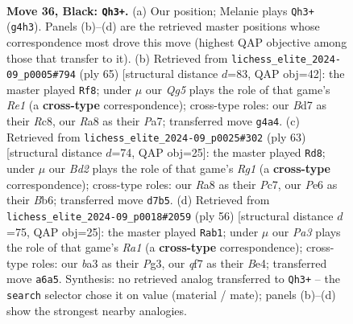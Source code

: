 \documentclass[11pt]{article}
\begin{document}
\clearpage

\begin{figure}[p]\centering
\begin{subfigure}{0.46\textwidth}\centering
\resizebox{\linewidth}{!}{%
\newchessgame
\chessboard[
  setfen={r2r3k/bp1b1Q2/p3p2p/8/6q1/BP1p4/PR3P1P/4RK2 b - - 1 36},
  showmover=false,
  pgfstyle=straightmove, color=movearrow, markmove={g4-h3}
]}
\caption{}
\end{subfigure}\hfill
\begin{subfigure}{0.46\textwidth}\centering
\resizebox{\linewidth}{!}{%
\newchessgame
\chessboard[
  setfen={2r1r2k/p5bp/7q/2p1pQ2/4B1P1/2P4P/PP1R2K1/3R4 b - - 4 33},
  showmover=false,
  pgfstyle=straightmove, color=movearrow, markmove={e8-f8}
]}
\caption{}
\end{subfigure}
\\[4pt]
\begin{subfigure}{0.46\textwidth}\centering
\resizebox{\linewidth}{!}{%
\newchessgame
\chessboard[
  setfen={1k4r1/1pp3r1/1b2Q3/2q5/5pPP/5B2/PR3P2/1R3K2 b - - 7 32},
  showmover=false,
  pgfstyle=straightmove, color=movearrow, markmove={g8-d8}
]}
\caption{}
\end{subfigure}\hfill
\begin{subfigure}{0.46\textwidth}\centering
\resizebox{\linewidth}{!}{%
\newchessgame
\chessboard[
  setfen={5rk1/1b1q1p1p/7p/4Q3/p2pB3/P2P2P1/2r2P2/R3R1K1 w - - 2 29},
  showmover=false,
  pgfstyle=straightmove, color=movearrow, markmove={a1-b1}
]}
\caption{}
\end{subfigure}
\caption{\textbf{Move 36, Black: \texttt{Qh3+}.} (a) Our position; Melanie plays \texttt{Qh3+} (\texttt{g4h3}). Panels (b)--(d) are the retrieved master positions whose correspondence most drove this move (highest QAP objective among those that transfer to it). (b) Retrieved from \texttt{lichess\_elite\_2024-09\_p0005\#794} (ply 65) [structural distance $d$=83, QAP obj=42]: the master played \texttt{Rf8}; under $\mu$ our \emph{Qg5} plays the role of that game's \emph{Re1} (a \textbf{cross-type} correspondence); cross-type roles: our \emph{B}d7 as their \emph{R}c8, our \emph{R}a8 as their \emph{P}a7; transferred move \texttt{g4a4}. (c) Retrieved from \texttt{lichess\_elite\_2024-09\_p0025\#302} (ply 63) [structural distance $d$=74, QAP obj=25]: the master played \texttt{Rd8}; under $\mu$ our \emph{Bd2} plays the role of that game's \emph{Rg1} (a \textbf{cross-type} correspondence); cross-type roles: our \emph{R}a8 as their \emph{P}c7, our \emph{P}e6 as their \emph{B}b6; transferred move \texttt{d7b5}. (d) Retrieved from \texttt{lichess\_elite\_2024-09\_p0018\#2059} (ply 56) [structural distance $d$=75, QAP obj=25]: the master played \texttt{Rab1}; under $\mu$ our \emph{Pa3} plays the role of that game's \emph{Ra1} (a \textbf{cross-type} correspondence); cross-type roles: our \emph{b}a3 as their \emph{P}g3, our \emph{q}f7 as their \emph{B}e4; transferred move \texttt{a6a5}. Synthesis: no retrieved analog transferred to \texttt{Qh3+} -- the \texttt{search} selector chose it on value (material / mate); panels (b)--(d) show the strongest nearby analogies.}
\label{fig:thought-m71}
\end{figure}
\end{document}
